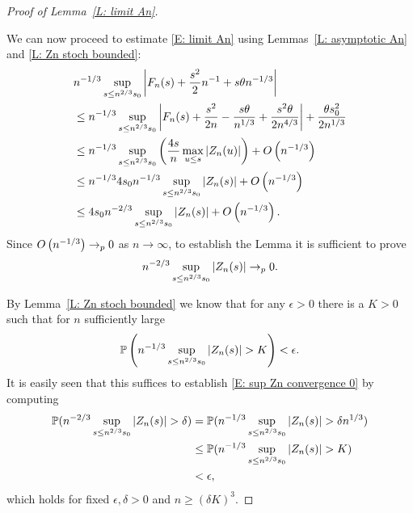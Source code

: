 \begin{proof}[Proof of Lemma~\ref{L: limit An}] \label{P: limit An}

	We can now proceed to estimate \eqref{E: limit An} using Lemmas~\ref{L: asymptotic An} and \ref{L: Zn stoch bounded}:
	\begin{equation}
	\begin{aligned}
	&n^{-1 / 3} \sup_{s \leq n^{2 / 3} s_0 }\left| F_n(s) + \frac{s^2}{2}n^{-1}  + s\theta n^{-1 / 3}  \right| \\
	&\leq n^{-1 / 3} \sup_{s \leq n^{2 / 3} s_0 } \left| F_n(s) + \frac{s^2}{2n} - \frac{s\theta}{n^{1 / 3}}  + \frac{s^2\theta}{2n^{4 / 3}}  \right| + \frac{\theta s_0^2}{2n^{1 / 3}} \\
	&\leq n^{-1 / 3} \sup_{s \leq n^{2 / 3} s_0 } \left(\frac{4s}{n} \max_{u \leq s} |Z_n(u)|\right) + O\left(n^{-1 / 3}\right) \\
	&\leq n^{-1 / 3} 4 s_0 n^{-1 / 3} \sup_{s \leq n^{2 / 3} s_0 } |Z_n(s)| + O\left(n^{-1 / 3}\right) \\
	&\leq 4 s_0 n^{-2 / 3} \sup_{s \leq n^{2 / 3} s_0 } |Z_n(s)| + O\left(n^{-1 / 3}\right).
	\end{aligned}
	\end{equation}
	Since $O\left(n^{-1 / 3}\right) \rightarrow_p 0$ as $n \rightarrow \infty$, to establish the Lemma it is sufficient to prove
	\begin{equation} \label{E: sup Zn convergence 0}
	n^{-2 / 3} \sup_{s \leq n^{2 / 3} s_0 } |Z_n(s)| \rightarrow_p 0.
	\end{equation}
	
	By Lemma~\ref{L: Zn stoch bounded} we know that for any  $ \epsilon > 0 $  there is a $ K > 0 $
	such that for $n$ sufficiently large 
	\begin{equation}
	\mathbb{P}\left( n^{-1/3} \sup_{s \leq n^{2 / 3} s_0 } |Z_n(s)| > K \right) < \epsilon. 
	\end{equation}
	It is easily seen that this suffices to establish \eqref{E: sup Zn convergence 0} by computing
	\begin{equation*}
	\begin{aligned}
	\mathbb{P}( n^{-2 / 3} \sup_{s \leq n^{2 / 3} s_0 } |Z_n(s)| > \delta)
	&= \mathbb{P}( n^{-1 / 3} \sup_{s \leq n^{2 / 3} s_0 } |Z_n(s)| > \delta n^{1 / 3} ) \\
	&\leq \mathbb{P}( n^{-1 / 3} \sup_{s \leq n^{2 / 3} s_0 } |Z_n(s)| > K) \\
	&< \epsilon,
	\end{aligned}
	\end{equation*}
	which holds for fixed $\epsilon, \delta > 0$ and $n \geq (\delta K)^3$.
\end{proof}



